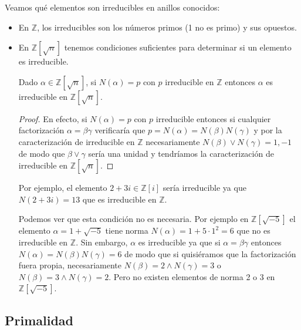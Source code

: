 \begin{example}
Veamos qué elementos son irreducibles en anillos conocidos:

\begin{itemize}
\item En $\mathbb{Z}$, los irreducibles son los números primos (1 no es primo) y sus opuestos. 

\item En $\mathbb{Z}[\sqrt{n}]$ tenemos condiciones suficientes para determinar si un elemento es irreducible. 

\begin{proposition}

Dado $\alpha \in \mathbb{Z}[\sqrt{n}]$, si $N(\alpha) = p$ con $p$ irreducible en $\mathbb{Z}$ entonces $\alpha$ es irreducible en $\mathbb{Z}[\sqrt{n}]$.
\end{proposition}
\begin{proof}
En efecto, si $N(\alpha) = p$ con $p$ irreducible entonces si cualquier factorización $\alpha = \beta \gamma$ verificaría que $p = N(\alpha) = N(\beta) N(\gamma)$ y por la caracterización de irreducible en $\mathbb{Z}$ necesariamente $N(\beta) \lor N(\gamma) = 1,-1$ de modo que $\beta \lor \gamma$ sería una unidad y tendríamos la caracterización de irreducible en $ \mathbb{Z}[\sqrt{n}]$.
\end{proof}

Por ejemplo, el elemento $2+3i \in \mathbb{Z}[i]$ sería irreducible ya que $N(2+3i) = 13$ que es irreducible en $\mathbb{Z}$.

Podemos ver que esta condición no es necesaria. Por ejemplo en $\mathbb{Z}[\sqrt{-5}]$ el elemento $\alpha = 1+\sqrt{-5}$ tiene norma $N(\alpha) = 1+ 5 \cdot 1^2 = 6$ que no es irreducible en $\mathbb{Z}$. Sin embargo, $\alpha$ es irreducible ya que si $\alpha = \beta \gamma$ entonces $N(\alpha) = N(\beta)N(\gamma) = 6$ de modo que si quisiéramos que la factorización fuera propia, necesariamente $N(\beta) = 2 \land N(\gamma) = 3$ o $N(\beta) = 3 \land N(\gamma) = 2$. Pero no existen elementos de norma 2 o 3 en $\mathbb{Z}[\sqrt{-5}]$.
\end{itemize}
\end{example}

\subsection{Primalidad}

